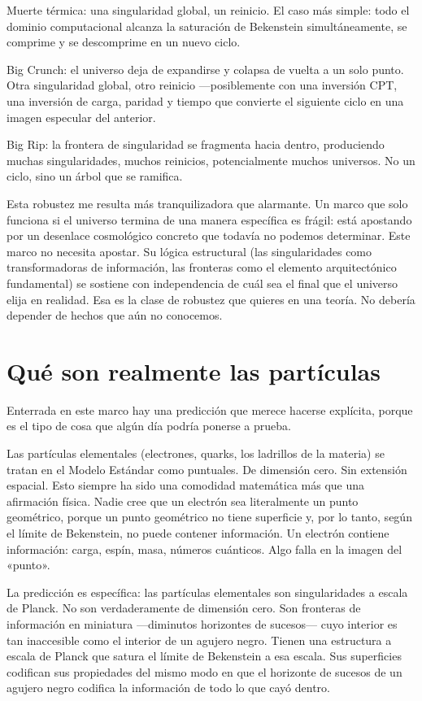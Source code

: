 \documentclass[11pt, twoside, openright]{book}
\begin{document}
Muerte térmica: una singularidad global, un reinicio. El caso más simple: todo el dominio computacional alcanza la saturación de Bekenstein simultáneamente, se comprime y se descomprime en un nuevo ciclo.

Big Crunch: el universo deja de expandirse y colapsa de vuelta a un solo punto. Otra singularidad global, otro reinicio ---posiblemente con una inversión CPT, una inversión de carga, paridad y tiempo que convierte el siguiente ciclo en una imagen especular del anterior.

Big Rip: la frontera de singularidad se fragmenta hacia dentro, produciendo muchas singularidades, muchos reinicios, potencialmente muchos universos. No un ciclo, sino un árbol que se ramifica.

Esta robustez me resulta más tranquilizadora que alarmante. Un marco que solo funciona si el universo termina de una manera específica es frágil: está apostando por un desenlace cosmológico concreto que todavía no podemos determinar. Este marco no necesita apostar. Su lógica estructural (las singularidades como transformadoras de información, las fronteras como el elemento arquitectónico fundamental) se sostiene con independencia de cuál sea el final que el universo elija en realidad. Esa es la clase de robustez que quieres en una teoría. No debería depender de hechos que aún no conocemos.


\section*{Qué son realmente las partículas}

Enterrada en este marco hay una predicción que merece hacerse explícita, porque es el tipo de cosa que algún día podría ponerse a prueba.

Las partículas elementales (electrones, quarks, los ladrillos de la materia) se tratan en el Modelo Estándar como puntuales. De dimensión cero. Sin extensión espacial. Esto siempre ha sido una comodidad matemática más que una afirmación física. Nadie cree que un electrón sea literalmente un punto geométrico, porque un punto geométrico no tiene superficie y, por lo tanto, según el límite de Bekenstein, no puede contener información. Un electrón contiene información: carga, espín, masa, números cuánticos. Algo falla en la imagen del «punto».

La predicción es específica: las partículas elementales son singularidades a escala de Planck. No son verdaderamente de dimensión cero. Son fronteras de información en miniatura ---diminutos horizontes de sucesos--- cuyo interior es tan inaccesible como el interior de un agujero negro. Tienen una estructura a escala de Planck que satura el límite de Bekenstein a esa escala. Sus superficies codifican sus propiedades del mismo modo en que el horizonte de sucesos de un agujero negro codifica la información de todo lo que cayó dentro.
\end{document}
